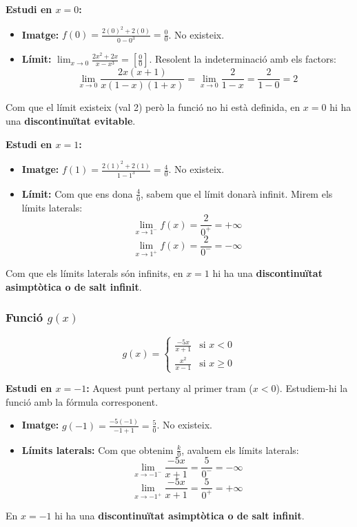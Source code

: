 \documentclass[12pt,a4paper]{article}
\begin{document}
\textbf{Estudi en $x = 0$:}
\begin{itemize}
    \item \textbf{Imatge:} $f(0) = \frac{2(0)^2 + 2(0)}{0 - 0^3} = \frac{0}{0}$. No existeix.
    \item \textbf{Límit:} $\lim_{x \to 0} \frac{2x^2 + 2x}{x - x^3} = \left[\frac{0}{0}\right]$. Resolent la indeterminació amb els factors:
    \[ \lim_{x \to 0} \frac{2x(x + 1)}{x(1 - x)(1 + x)} = \lim_{x \to 0} \frac{2}{1 - x} = \frac{2}{1 - 0} = 2 \]
\end{itemize}
Com que el límit existeix (val 2) però la funció no hi està definida, en $x = 0$ hi ha una \textbf{discontinuïtat evitable}.

\textbf{Estudi en $x = 1$:}
\begin{itemize}
    \item \textbf{Imatge:} $f(1) = \frac{2(1)^2 + 2(1)}{1 - 1^3} = \frac{4}{0}$. No existeix.
    \item \textbf{Límit:} Com que ens dona $\frac{4}{0}$, sabem que el límit donarà infinit. Mirem els límits laterals:
    \[ \lim_{x \to 1^-} f(x) = \frac{2}{0^+} = +\infty \]
    \[ \lim_{x \to 1^+} f(x) = \frac{2}{0^-} = -\infty \]
\end{itemize}
Com que els límits laterals són infinits, en $x = 1$ hi ha una \textbf{discontinuïtat asimptòtica o de salt infinit}.

\vspace{0.5cm}

\subsubsection*{Funció $g(x)$}
\[ g(x) = \begin{cases} \frac{-5x}{x+1} & \text{si } x < 0 \\ \frac{x^2}{x-1} & \text{si } x \ge 0 \end{cases} \]

\textbf{Estudi en $x = -1$:}
Aquest punt pertany al primer tram ($x < 0$). Estudiem-hi la funció amb la fórmula corresponent.
\begin{itemize}
    \item \textbf{Imatge:} $g(-1) = \frac{-5(-1)}{-1+1} = \frac{5}{0}$. No existeix.
    \item \textbf{Límits laterals:} Com que obtenim $\frac{k}{0}$, avaluem els límits laterals:
    \[ \lim_{x \to -1^-} \frac{-5x}{x+1} = \frac{5}{0^-} = -\infty \]
    \[ \lim_{x \to -1^+} \frac{-5x}{x+1} = \frac{5}{0^+} = +\infty \]
\end{itemize}
En $x = -1$ hi ha una \textbf{discontinuïtat asimptòtica o de salt infinit}.
\end{document}

